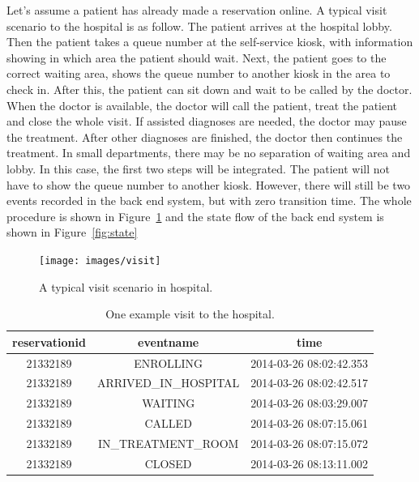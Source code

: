 Let's assume a patient has already made a reservation online. A typical visit scenario to the hospital is as follow. The patient arrives at the hospital lobby. Then the patient takes a queue number at the self-service kiosk, with information showing in which area the patient should wait. Next, the patient goes to the correct waiting area, shows the queue number to another kiosk in the area to check in. After this, the patient can sit down and wait to be called by the doctor. When the doctor is available, the doctor will call the patient, treat the patient and close the whole visit. If assisted diagnoses are needed, the doctor may pause the treatment. After other diagnoses are finished, the doctor then continues the treatment. In small departments, there may be no separation of waiting area and lobby. In this case, the first two steps will be integrated. The patient will not have to show the queue number to another kiosk. However, there will still be two events recorded in the back end system, but with zero transition time. The whole procedure is shown in Figure~\ref{fig:visit} and the state flow of the back end system is shown in Figure~\ref{fig:state}

\begin{figure}
	\begin{center}
		\texttt{[image: images/visit]}
		\caption{A typical visit scenario in hospital.}
		\label{fig:visit}
	\end{center}
\end{figure}

\begin{table}
	\caption{One example visit to the hospital.}
	\label{table:example}
	\begin{tabular}{|c|c|c|}
		\hline
		 reservationid &      eventname      &          time	\\ \hline

	      21332189 & ENROLLING           & 2014-03-26 08:02:42.353	\\ \hline
	      21332189 & ARRIVED\_IN\_HOSPITAL & 2014-03-26 08:02:42.517	\\ \hline
    	  21332189 & WAITING             & 2014-03-26 08:03:29.007	\\ \hline
	      21332189 & CALLED              & 2014-03-26 08:07:15.061	\\ \hline
    	  21332189 & IN\_TREATMENT\_ROOM   & 2014-03-26 08:07:15.072	\\ \hline
	      21332189 & CLOSED              & 2014-03-26 08:13:11.002	\\ \hline
	\end{tabular}
\end{table}

